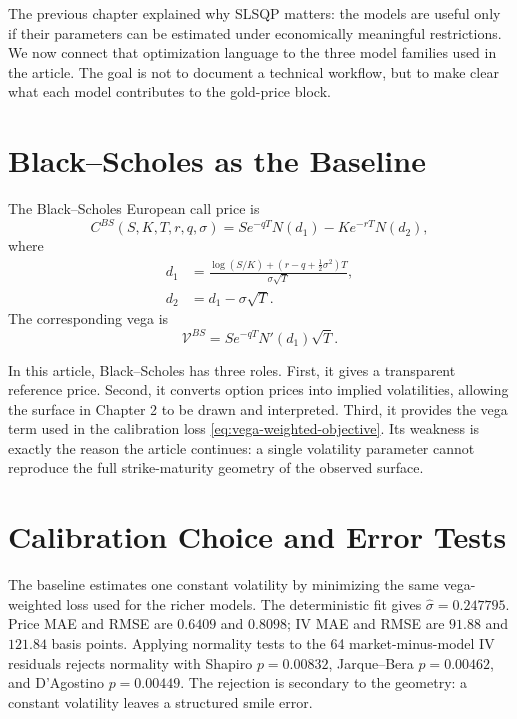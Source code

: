\documentclass[a4paper,10pt,titlepage,oneside,openany]{book}
\theoremstyle{plain}
\theoremstyle{definition}
\theoremstyle{remark}
\newcommand{\vega}{\mathcal{V}}
\begin{document}
The previous chapter explained why SLSQP matters: the models are useful only if their parameters can be estimated under economically meaningful restrictions. We now connect that optimization language to the three model families used in the article. The goal is not to document a technical workflow, but to make clear what each model contributes to the gold-price block.

\section{Black--Scholes as the Baseline}

The Black--Scholes European call price is
\begin{equation}
    C^{BS}(S,K,T,r,q,\sigma)
    =
    S e^{-qT}N(d_1)-K e^{-rT}N(d_2),
\end{equation}
where
\begin{align}
    d_1 &=
    \frac{\log(S/K)+(r-q+\frac{1}{2}\sigma^2)T}{\sigma\sqrt{T}},\\
    d_2 &= d_1-\sigma\sqrt{T}.
\end{align}
The corresponding vega is
\begin{equation}
    \vega^{BS}
    =
    S e^{-qT} N'(d_1)\sqrt{T}.
\end{equation}

In this article, Black--Scholes has three roles. First, it gives a transparent reference price. Second, it converts option prices into implied volatilities, allowing the surface in Chapter 2 to be drawn and interpreted. Third, it provides the vega term used in the calibration loss \eqref{eq:vega-weighted-objective}. Its weakness is exactly the reason the article continues: a single volatility parameter cannot reproduce the full strike-maturity geometry of the observed surface.

\section{Calibration Choice and Error Tests}

The baseline estimates one constant volatility by minimizing the same vega-weighted loss used for the richer models. The deterministic fit gives \(\widehat\sigma=0.247795\). Price MAE and RMSE are \(0.6409\) and \(0.8098\); IV MAE and RMSE are \(91.88\) and \(121.84\) basis points. Applying normality tests to the 64 market-minus-model IV residuals rejects normality with Shapiro \(p=0.00832\), Jarque--Bera \(p=0.00462\), and D'Agostino \(p=0.00449\). The rejection is secondary to the geometry: a constant volatility leaves a structured smile error.
\end{document}
